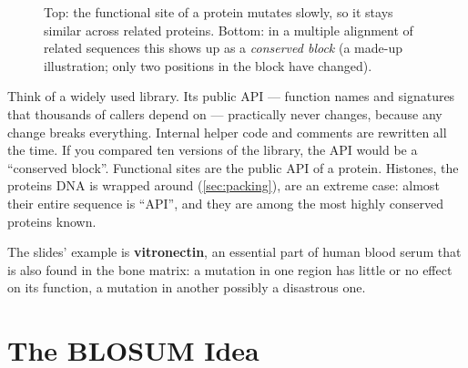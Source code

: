 \documentclass[11pt, oneside]{book}
\let\originalsection\section
\renewcommand{\section}{\Needspace{7\baselineskip}\originalsection}
\begin{document}
\begin{figure}[htbp]

\caption{Top: the functional site of a protein mutates slowly, so it stays
similar across related proteins. Bottom: in a multiple alignment of related
sequences this shows up as a \emph{conserved block} (a made-up illustration;
only two positions in the block have changed).}
\label{fig:functional-blocks}
\end{figure}

\begin{intbox}[title={The software analogy}]
Think of a widely used library. Its public API --- function names and
signatures that thousands of callers depend on --- practically never changes,
because any change breaks everything. Internal helper code and comments are
rewritten all the time. If you compared ten versions of the library, the API
would be a ``conserved block''. Functional sites are the public API of a
protein. Histones, the proteins DNA is wrapped around (\cref{sec:packing}), are
an extreme case: almost their entire sequence is ``API'', and they are among
the most highly conserved proteins known.
\end{intbox}

The slides' example is \textbf{vitronectin}, an essential part of human blood
serum that is also found in the bone matrix: a mutation in one region has
little or no effect on its function, a mutation in another possibly a
disastrous one.

\section{The BLOSUM Idea}
\label{sec:blosum}
\end{document}
